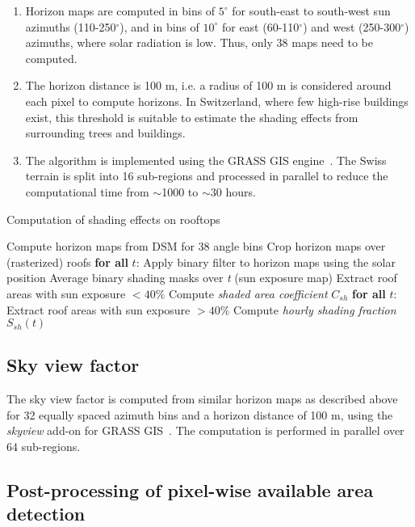 \begin{enumerate}
    \item Horizon maps are computed in bins of $5^\circ$ for south-east to south-west sun azimuths (110-250$^\circ$), and in bins of $10^\circ$ for east (60-110$^\circ$) and west (250-300$^\circ$) azimuths, where solar radiation is low. Thus, only 38 maps need to be computed.
    \item The horizon distance is 100 m, i.e. a radius of 100 m is considered around each pixel to compute horizons. In Switzerland, where few high-rise buildings exist, this threshold is suitable to estimate the shading effects from surrounding trees and buildings.
    \item The algorithm is implemented using the GRASS GIS engine~\cite{neteler_grass_2012}. The Swiss terrain is split into 16 sub-regions and processed in parallel to reduce the computational time from $\sim$1000 to $\sim$30 hours. 
    
\end{enumerate}

\begin{algorithm}[htbp]
\caption{Computation of shading effects on rooftops}
\label{alg:shade}
\begin{algorithmic}[1]
  \footnotesize
  \State Compute horizon maps from DSM for 38 angle bins
  \State Crop horizon maps over (rasterized) roofs
  \Statex \textbf{for all} $t$:
    \State \qquad Apply binary filter to horizon maps using the solar position
  \State Average binary shading masks over \textit{t} (sun exposure map)
  \State Extract roof areas with sun exposure $< 40\%$
  \State Compute \textit{shaded area coefficient} $C_{sh}$
  \Statex \textbf{for all} $t$:
  	\State \qquad Extract roof areas with sun exposure $> 40\%$
    \State \qquad Compute \textit{hourly shading fraction} $S_{sh}(t)$
\end{algorithmic}
\end{algorithm}

\subsection*{Sky view factor}

The sky view factor is computed from similar horizon maps as described above for 32 equally spaced azimuth bins and a horizon distance of 100 m, using the \textit{skyview} add-on for GRASS GIS~\cite{zaksek_sky-view_2011}. The computation is performed in parallel over 64 sub-regions.

\subsection{Post-processing of pixel-wise available area detection}
\label{app:CNN_postprocess}

